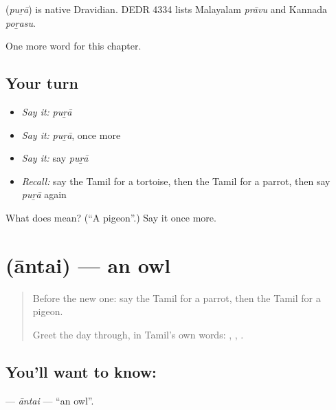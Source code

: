 \begin{cousinweb}
\textbf{} (\emph{puṟā}) is native Dravidian. DEDR 4334 lists Malayalam \emph{prāvu} and Kannada \emph{poṟasu}.
\end{cousinweb}

\begin{grammarlens}[title={What you've built}]
One more word for this chapter.
\end{grammarlens}

\subsection*{Your turn}
\begin{itemize}
\raggedright
  \item \emph{Say it:} \emph{puṟā}
  \item \emph{Say it:} \emph{puṟā}, once more
  \item \emph{Say it:} say \emph{puṟā}
  \item \emph{Recall:} say the Tamil for a tortoise, then the Tamil for a parrot, then say \emph{puṟā} again
\end{itemize}

\begin{tcolorbox}[breakable,colback=teal!4,colframe=teal!35!black,title={Before you move on}]
What does  mean? (\textquotedblleft{}A pigeon\textquotedblright{}.) Say it once more.
\end{tcolorbox}
\section[\texorpdfstring{\ta{ஆந்தை} (āntai)}{ஆந்தை (āntai)}]{ (āntai) — an owl}

\label{lesson:TA-C131-antai}



\begin{quote}
Before the new one: say the Tamil for a parrot, then the Tamil for a pigeon.

Greet the day through, in Tamil's own words: \textbf{ }, \textbf{ }, \textbf{ }.
\end{quote}

\subsection*{You'll want to know: }
\textbf{} — \emph{āntai} — \textquotedblleft{}an owl\textquotedblright{}.

